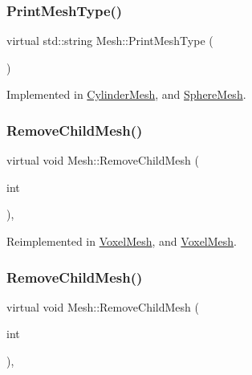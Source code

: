 \mbox{\label{class_mesh_a0d34fc4317a5e3bc2437b610141b9109}} 
\subsubsection{\texorpdfstring{PrintMeshType()}{PrintMeshType()}}
{\footnotesize\ttfamily virtual std\+::string Mesh\+::\+Print\+Mesh\+Type (\begin{DoxyParamCaption}{ }\end{DoxyParamCaption})\hspace{0.3cm}{\ttfamily [pure virtual]}}



Implemented in \mbox{\hyperlink{class_cylinder_mesh_aa5edae04a31b3ccab1e051eba25781a7}{Cylinder\+Mesh}}, and \mbox{\hyperlink{class_sphere_mesh_ad40fa08f33e72acf0410c2ce6099ca4c}{Sphere\+Mesh}}.

\mbox{\label{class_mesh_a530e7b4ea82226f6e15b0ff6c36ea3d8}} 
\subsubsection{\texorpdfstring{RemoveChildMesh()}{RemoveChildMesh()}\hspace{0.1cm}{\footnotesize\ttfamily [1/2]}}
{\footnotesize\ttfamily virtual void Mesh\+::\+Remove\+Child\+Mesh (\begin{DoxyParamCaption}\item[{int}]{ }\end{DoxyParamCaption})\hspace{0.3cm}{\ttfamily [inline]}, {\ttfamily [virtual]}}



Reimplemented in \mbox{\hyperlink{class_voxel_mesh_ae86555f2df9a4ba3b21b62a4bd26b591}{Voxel\+Mesh}}, and \mbox{\hyperlink{class_voxel_mesh_ae86555f2df9a4ba3b21b62a4bd26b591}{Voxel\+Mesh}}.

\mbox{\label{class_mesh_a530e7b4ea82226f6e15b0ff6c36ea3d8}} 
\subsubsection{\texorpdfstring{RemoveChildMesh()}{RemoveChildMesh()}\hspace{0.1cm}{\footnotesize\ttfamily [2/2]}}
{\footnotesize\ttfamily virtual void Mesh\+::\+Remove\+Child\+Mesh (\begin{DoxyParamCaption}\item[{int}]{ }\end{DoxyParamCaption})\hspace{0.3cm}{\ttfamily [inline]}, {\ttfamily [virtual]}}



